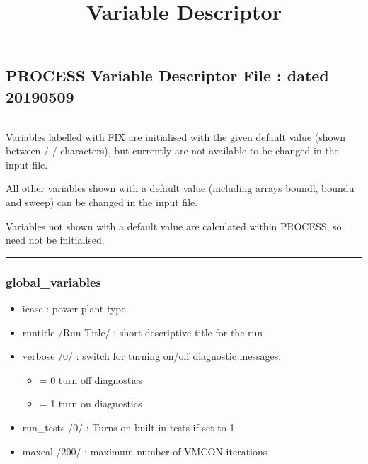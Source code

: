 \documentclass[]{article}
\title{Variable Descriptor}
\date{}
\providecommand{\tightlist}{%
  \setlength{\itemsep}{0pt}\setlength{\parskip}{0pt}}
\begin{document}
\maketitle

\subsection{PROCESS Variable Descriptor File : dated
20190509}\label{process-variable-descriptor-file-dated-20190509}

\begin{center}\rule{0.5\linewidth}{\linethickness}\end{center}

Variables labelled with FIX are initialised with the given default value
(shown between / / characters), but currently are not available to be
changed in the input file.

All other variables shown with a default value (including arrays boundl,
boundu and sweep) can be changed in the input file.

Variables not shown with a default value are calculated within PROCESS,
so need not be initialised.

\begin{center}\rule{0.5\linewidth}{\linethickness}\end{center}

\subsubsection{\texorpdfstring{\href{global_variables.html}{global\_variables}}{global\_variables}}\label{global_variables}

\begin{itemize}
\tightlist
\item
  icase : power plant type
\item
  runtitle /Run Title/ : short descriptive title for the run
\item
  verbose /0/ : switch for turning on/off diagnostic messages:

  \begin{itemize}
  \tightlist
  \item
    = 0 turn off diagnostics
  \item
    = 1 turn on diagnostics
  \end{itemize}
\item
  run\_tests /0/ : Turns on built-in tests if set to 1
\item
  maxcal /200/ : maximum number of VMCON iterations
\end{itemize}
\end{document}
